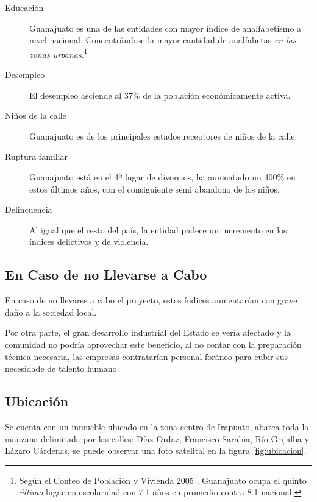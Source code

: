 \begin{description}
	\item[Educación] Guanajuato es una de las entidades con mayor índice de analfabetismo a nivel nacional. Concentrándose la mayor cantidad de analfabetas \emph{en las zonas urbanas}.\footnote{Seg\'{u}n el Conteo de Poblaci\'{o}n y Vivienda 2005 \citep{Inegi2005}, Guanajuato ocupa el quinto \emph{\'{u}ltimo} lugar en escolaridad con 7.1 a\~nos en promedio contra 8.1 nacional.}
	\item[Desempleo] El desempleo asciende al 37\% de la población económicamente activa.
	\item[Niños de la calle] Guanajuato es de los principales estados receptores de niños de la calle.
	\item[Ruptura familiar] Guanajuato está en el 4º lugar de divorcios, ha aumentado un 400\% en estos últimos años, con el consiguiente semi abandono de los niños.
	\item[Delincuencia] Al igual que el resto del país, la entidad padece un incremento en los índices delictivos y de violencia.
\end{description}

\subsection{En Caso de no Llevarse a Cabo}

En caso de no llevarse a cabo el proyecto, estos índices aumentarían con grave daño a la sociedad local.

Por otra parte, el gran desarrollo industrial del Estado se vería afectado y la comunidad no podría aprovechar este beneficio, al no contar con la preparación técnica necesaria, las empresas contratarían personal foráneo para cubir sus necesidade de talento humano.

\subsection{Ubicación}

Se cuenta con un inmueble ubicado en la zona centro de Irapuato, abarca toda la manzana delimitada por las calles: Díaz Ordaz, Francisco Sarabia, Río Grijalba y Lázaro Cárdenas, se puede observar una foto satelital en la figura \ref{fig:ubicacion}.

